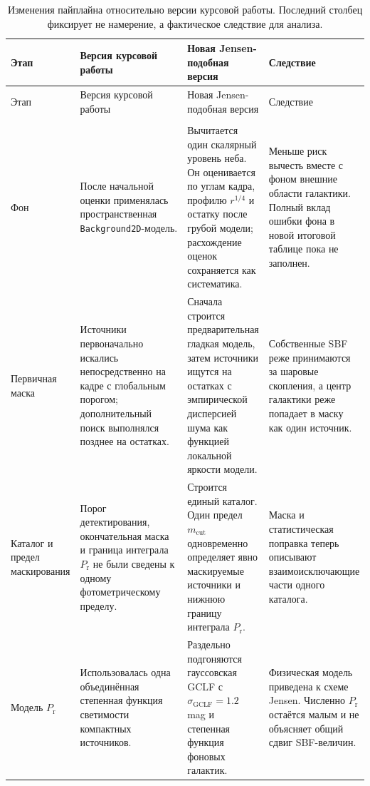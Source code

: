 \documentclass[12pt,a4paper]{article}
\begin{document}
\footnotesize
\begin{longtable}{
    >{\raggedright\arraybackslash}p{}
    >{\raggedright\arraybackslash}p{}
    >{\raggedright\arraybackslash}p{}
    >{\raggedright\arraybackslash}p{}}
\caption{Изменения пайплайна относительно версии курсовой
работы. Последний столбец фиксирует не намерение, а
фактическое следствие для анализа.}
\label{tab:pipeline_changes}\\
\toprule
Этап & Версия курсовой работы & Новая Jensen-подобная версия
& Следствие \\
\midrule
\endfirsthead
\toprule
Этап & Версия курсовой работы & Новая Jensen-подобная версия
& Следствие \\
\midrule
\endhead
\midrule
\multicolumn{4}{r}{Продолжение на следующей странице}\\
\endfoot
\bottomrule
\endlastfoot

Фон &
После начальной оценки применялась пространственная
\texttt{Background2D}-модель. &
Вычитается один скалярный уровень неба. Он оценивается по
углам кадра, профилю \(r^{1/4}\) и остатку после грубой
модели; расхождение оценок сохраняется как систематика. &
Меньше риск вычесть вместе с фоном внешние области
галактики. Полный вклад ошибки фона в новой итоговой таблице
пока не заполнен. \\

Первичная маска &
Источники первоначально искались непосредственно на кадре с
глобальным порогом; дополнительный поиск выполнялся позднее
на остатках. &
Сначала строится предварительная гладкая модель, затем
источники ищутся на остатках с эмпирической дисперсией шума
как функцией локальной яркости модели. &
Собственные SBF реже принимаются за шаровые скопления, а
центр галактики реже попадает в маску как один источник. \\

Каталог и предел маскирования &
Порог детектирования, окончательная маска и граница интеграла
\(P_{\mathrm r}\) не были сведены к одному фотометрическому
пределу. &
Строится единый каталог. Один предел \(m_{\mathrm{cut}}\)
одновременно определяет явно маскируемые источники и нижнюю
границу интеграла \(P_{\mathrm r}\). &
Маска и статистическая поправка теперь описывают
взаимоисключающие части одного каталога. \\

Модель \(P_{\mathrm r}\) &
Использовалась одна объединённая степенная функция
светимости компактных источников. &
Раздельно подгоняются гауссовская GCLF с
\(\sigma_{\mathrm{GCLF}}=1.2\) mag и степенная функция
фоновых галактик. &
Физическая модель приведена к схеме Jensen. Численно
\(P_{\mathrm r}\) остаётся малым и не объясняет общий сдвиг
SBF-величин. \\


\end{longtable}
\end{document}
